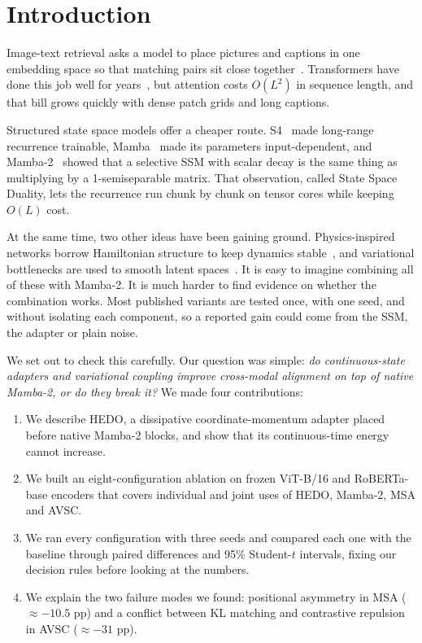 \documentclass[pdflatex,sn-mathphys-num]{sn-jnl}
\begin{document}
\section{Introduction}
\label{sec:intro}

Image-text retrieval asks a model to place pictures and captions in one embedding space so that matching pairs sit close together~\cite{radford2021learning,wang2016comprehensive}. Transformers have done this job well for years~\cite{vaswani2017attention,dosovitskiy2021image,liu2019roberta}, but attention costs $O(L^2)$ in sequence length, and that bill grows quickly with dense patch grids and long captions.

Structured state space models offer a cheaper route. S4~\cite{gu2022efficiently} made long-range recurrence trainable, Mamba~\cite{gu2023mamba} made its parameters input-dependent, and Mamba-2~\cite{dao2024transformers} showed that a selective SSM with scalar decay is the same thing as multiplying by a 1-semiseparable matrix. That observation, called State Space Duality, lets the recurrence run chunk by chunk on tensor cores while keeping $O(L)$ cost.

At the same time, two other ideas have been gaining ground. Physics-inspired networks borrow Hamiltonian structure to keep dynamics stable~\cite{greydanus2019hamiltonian,vanderschaft2000}, and variational bottlenecks are used to smooth latent spaces~\cite{kingma2014auto,alemi2017deep}. It is easy to imagine combining all of these with Mamba-2. It is much harder to find evidence on whether the combination works. Most published variants are tested once, with one seed, and without isolating each component, so a reported gain could come from the SSM, the adapter or plain noise.

We set out to check this carefully. Our question was simple: \emph{do continuous-state adapters and variational coupling improve cross-modal alignment on top of native Mamba-2, or do they break it?} We made four contributions:
\begin{enumerate}
\item We describe HEDO, a dissipative coordinate-momentum adapter placed before native Mamba-2 blocks, and show that its continuous-time energy cannot increase.
\item We built an eight-configuration ablation on frozen ViT-B/16 and RoBERTa-base encoders that covers individual and joint uses of HEDO, Mamba-2, MSA and AVSC.
\item We ran every configuration with three seeds and compared each one with the baseline through paired differences and 95\% Student-$t$ intervals, fixing our decision rules before looking at the numbers.
\item We explain the two failure modes we found: positional asymmetry in MSA ($\approx-10.5$ pp) and a conflict between KL matching and contrastive repulsion in AVSC ($\approx-31$ pp).
\end{enumerate}
\end{document}

